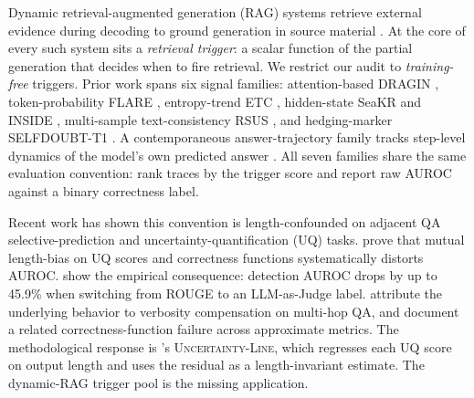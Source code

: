 \documentclass[11pt]{article}
\begin{document}
Dynamic retrieval-augmented generation (RAG) systems retrieve external evidence during decoding to ground generation in source material \citep{lewis_retrieval-augmented_2021, trivedi_interleaving_2023, shao_enhancing_2023}. At the core of every such system sits a \emph{retrieval trigger}: a scalar function of the partial generation that decides when to fire retrieval. We restrict our audit to \emph{training-free} triggers. Prior work spans six signal families: attention-based DRAGIN \citep{su_dragin_2024}, token-probability FLARE \citep{jiang_active_2023}, entropy-trend ETC \citep{li_modeling_2026}, hidden-state SeaKR \citep{yao_seakr_nodate} and INSIDE \citep{chen_inside_2024}, multi-sample text-consistency RSUS \citep{guo_realm_2026}, and hedging-marker SELFDOUBT-T1 \citep{pandey_selfdoubt_2026}. A contemporaneous answer-trajectory family tracks step-level dynamics of the model's own predicted answer \citep{datta_large_2026, wang_chain--probe_nodate, chen_i_2026}. All seven families share the same evaluation convention: rank traces by the trigger score and report raw AUROC against a binary correctness label.

Recent work has shown this convention is length-confounded on adjacent QA selective-prediction and uncertainty-quantification (UQ) tasks. \citet{santilli_revisiting_2025} prove that mutual length-bias on UQ scores and correctness functions systematically distorts AUROC. \citet{janiak_illusion_nodate} show the empirical consequence: detection AUROC drops by up to 45.9\% when switching from ROUGE to an LLM-as-Judge label. \citet{zhang_verbosity_2024} attribute the underlying behavior to verbosity compensation on multi-hop QA, and \citet{ielanskyi_addressing_2025} document a related correctness-function failure across approximate metrics. The methodological response is \citet{vashurin_uncertainty-line_2025}'s \textsc{Uncertainty-Line}, which regresses each UQ score on output length and uses the residual as a length-invariant estimate. The dynamic-RAG trigger pool is the missing application.
\end{document}
